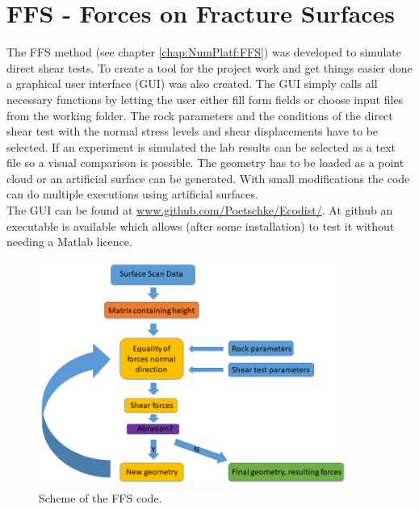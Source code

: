 \section{FFS - Forces on Fracture Surfaces}
The FFS method (see chapter \ref{chap:NumPlatf:FFS}) was developed to simulate direct shear tests. To create a tool for the project work and get things easier done a graphical user interface (GUI) was also created. The GUI simply calls all necessary functions by letting the user either fill form fields or choose input files from the working folder. The rock parameters and the conditions of the direct shear test with the normal stress levels and shear displacements have to be selected. If an experiment is simulated the lab results can be selected as a text file so a visual comparison is possible. The geometry has to be loaded as a point cloud or an artificial surface can be generated. With small modifications the code can do multiple executions using artificial surfaces.\\
The GUI can be found at \url{www.github.com/Poetschke/Ecodist/}. At github an executable is available which allows (after some installation) to test it without needing a Matlab licence.\\
\begin{figure}[htp!]
    \centering
    \includegraphics[width=0.9\textwidth]{figures/MEX7_Scheme.png}
    \caption{Scheme of the FFS code.}
    \label{fig:AppendixFFSFigure}
\end{figure}

